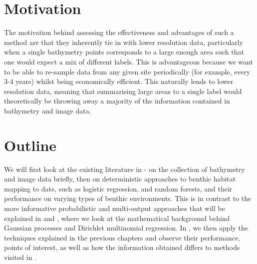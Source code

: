 \section{Motivation}

 The motivation behind assessing the effectiveness and advantages of such a method are that they inherently tie in with lower resolution data, particularly when a single bathymetry points corresponds to a large enough area such that one would expect a mix of different labels. This is advantageous because we want to be able to re-sample data from any given site periodically (for example, every 3-4 years) whilst being economically efficient. This naturally lends to lower resolution data, meaning that summarising large areas to a single label would theoretically be throwing away a majority of the information contained in bathymetry and image data.

\section{Outline}

We will first look at the existing literature in  - on the collection of bathymetry and image data briefly, then on deterministic approaches to benthic habitat mapping to date, such as logistic regression, and random forests, and their performance on varying types of benthic environments. This is in contrast to the more informative probabilistic and multi-output approaches that will be explained in  and , where we look at the mathematical background behind Gaussian processes and Dirichlet multinomial regression. In , we then apply the techniques explained in the previous chapters and observe their performance, points of interest, as well as how the information obtained differs to methods visited in . 
